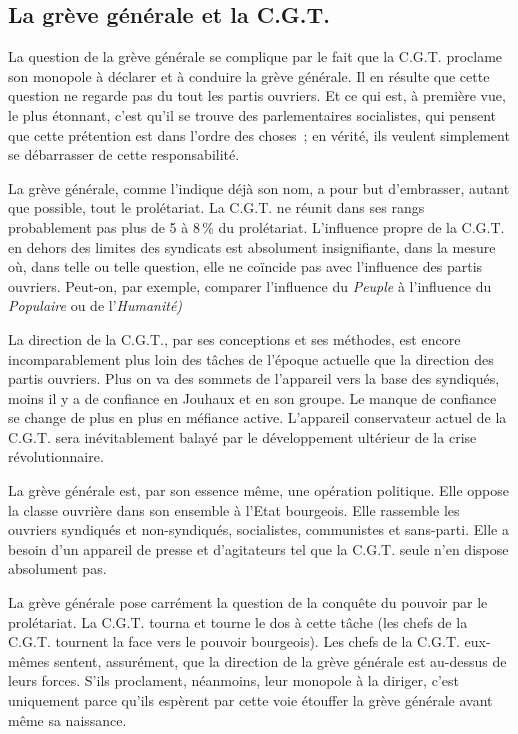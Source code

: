 \documentclass[french,twoside]{book} %
\begin{document}
\subsection[{La grève générale et la C.G.T.}]{La grève générale et la C.G.T.}
\noindent La question de la grève générale se complique par le fait que la C.G.T. proclame son monopole à déclarer et à conduire la grève générale. Il en résulte que cette question ne regarde pas du tout les partis ouvriers. Et ce qui est, à première vue, le plus étonnant, c’est qu’il se trouve des parlementaires socialistes, qui pensent que cette prétention est dans l’ordre des choses ; en vérité, ils veulent simplement se débarrasser de cette responsabilité.\par
La grève générale, comme l’indique déjà son nom, a pour but d’embrasser, autant que possible, tout le prolétariat. La C.G.T. ne réunit dans ses rangs probablement pas plus de 5 à 8 \% du prolétariat. L’influence propre de la C.G.T. en dehors des limites des syndicats est absolument insignifiante, dans la mesure où, dans telle ou telle question, elle ne coïncide pas avec l’influence des partis ouvriers. Peut-on, par exemple, comparer l’influence du \emph{Peuple} à l’influence du \emph{Populaire} ou de l’\emph{Humanité)}\par
La direction de la C.G.T., par ses conceptions et ses méthodes, est encore incomparablement plus loin des tâches de l’époque actuelle que la direction des partis ouvriers. Plus on va des sommets de l’appareil vers la base des syndiqués, moins il y a de confiance en Jouhaux et en son groupe. Le manque de confiance se change de plus  en plus en méfiance active. L’appareil conservateur actuel de la C.G.T. sera inévitablement balayé par le développement ultérieur de la crise révolutionnaire.\par
La grève générale est, par son essence même, une opération politique. Elle oppose la classe ouvrière dans son ensemble à l’Etat bourgeois. Elle rassemble les ouvriers syndiqués et non-syndiqués, socialistes, communistes et sans-parti. Elle a besoin d’un appareil de presse et d’agitateurs tel que la C.G.T. seule n’en dispose absolument pas.\par
La grève générale pose carrément la question de la conquête du pouvoir par le prolétariat. La C.G.T. tourna et tourne le dos à cette tâche (les chefs de la C.G.T. tournent la face vers le pouvoir bourgeois). Les chefs de la C.G.T. eux-mêmes sentent, assurément, que la direction de la grève générale est au-dessus de leurs forces. S’ils proclament, néanmoins, leur monopole à la diriger, c’est uniquement parce qu’ils espèrent par cette voie étouffer la grève générale avant même sa naissance.\par
\end{document}
